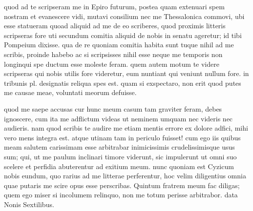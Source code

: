 


 quod ad te scripseram me in Epiro futurum, postea quam extenuari spem nostram et evanescere vidi, mutavi consilium nec me Thessalonica commovi, ubi esse statueram quoad aliquid ad me de eo scriberes, quod proximis litteris scripseras fore uti secundum comitia aliquid de nobis in senatu ageretur; id tibi Pompeium dixisse. qua de re quoniam comitia habita sunt tuque nihil ad me scribis, proinde habebo ac si scripsisses nihil esse neque me temporis non longinqui spe ductum esse moleste feram. quem autem motum te videre scripseras qui nobis utilis fore videretur, eum nuntiant qui veniunt nullum fore. in tribunis pl. designatis reliqua spes est. quam si exspectaro, non erit quod putes me causae meae, voluntati meorum defuisse.

 quod me saepe accusas cur hunc meum casum tam graviter feram, debes ignoscere, cum ita me adflictum videas ut neminem umquam nec videris nec audieris. nam quod scribis te audire me etiam mentis errore ex dolore adfici, mihi vero mens integra est. atque utinam tam in periculo fuisset! cum ego iis quibus meam salutem carissimam esse arbitrabar inimicissimis crudelissimisque usus sum; qui, ut me paulum inclinari timore viderunt, sic impulerunt ut omni suo scelere et perfidia abuterentur ad exitium meum. nunc quoniam est Cyzicum nobis eundum, quo rarius ad me litterae perferentur, hoc velim diligentius omnia quae putaris me scire opus esse perscribas. Quintum fratrem meum fac diligas; quem ego miser si incolumem relinquo, non me totum perisse arbitrabor. data Nonis Sextilibus.
